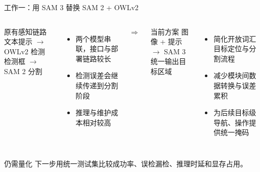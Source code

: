 \documentclass[aspectratio=169,10pt]{ctexbeamer}
\begin{document}
\begin{frame}{工作一：用 SAM 3 替换 SAM 2 + OWLv2}
  \begin{columns}[T,onlytextwidth]
      \begin{block}{原有感知链路}
        \centering
        文本提示 $\rightarrow$ OWLv2 检测\\[0.15cm]
        检测框 $\rightarrow$ SAM 2 分割
      \end{block}
      \begin{itemize}
        \item 两个模型串联，接口与部署链路较长
        \item 检测误差会继续传递到分割阶段
        \item 推理与维护成本相对较高
      \end{itemize}

      \vspace{1.5cm}
      \centering
      {\Large $\Longrightarrow$}

      \begin{block}{当前方案}
        \centering
        图像 + 提示 $\rightarrow$ SAM 3\\[0.15cm]
        统一输出目标区域
      \end{block}
      \begin{itemize}
        \item 简化开放词汇目标定位与分割流程
        \item 减少模块间数据转换与误差累积
        \item 为后续目标级导航、操作提供统一掩码
      \end{itemize}
  \end{columns}

  \vspace{0.25cm}
  \begin{alertblock}{仍需量化}
    下一步用统一测试集比较成功率、误检漏检、推理时延和显存占用。
  \end{alertblock}
\end{frame}
\end{document}
